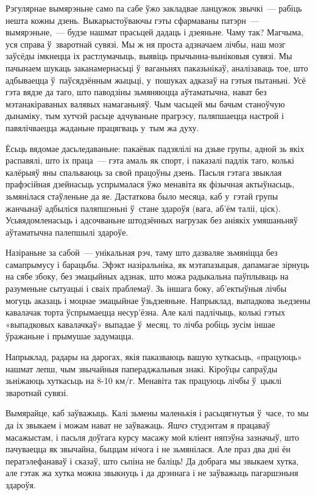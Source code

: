 Рэгулярнае вымярэньне само па сабе ўжо закладвае ланцужок звычкі~--- рабіць нешта кожны дзень. Выкарыстоўваючы гэты сфармаваны патэрн~--- вымярэньне,~--- будзе нашмат прасьцей дадаць і дзеяньне. Чаму так? Магчыма, уся справа ў~зваротнай сувязі. Мы ж ня проста адзначаем лічбы, наш мозг заўсёды імкнецца іх растлумачыць, выявіць прычынна-выніковыя сувязі. Мы пачынаем шукаць заканамернасьці ў~ваганьнях паказьнікаў, аналізаваць тое, што адбываецца ў~паўсядзённым жыцьці, у~пошуках адказаў на гэтыя пытаньні. Усё гэта вядзе да таго, што паводзіны зьмяняюцца аўтаматычна, нават без мэтанакіраваных валявых намаганьняў. Чым часьцей мы бачым станоўчую дынаміку, тым хутчэй расьце адчуваньне прагрэсу, паляпшаецца настрой і павялічваецца жаданьне працягваць у~тым жа духу.

Ёсьць вядомае дасьледаваньне: пакаёвак падзялілі на дзьве групы, адной зь якіх распавялі, што іх праца~--- гэта амаль як спорт, і паказалі падлік таго, колькі калёрыяў яны спальваюць за свой працоўны дзень. Пасьля гэтага звыклая прафэсійная дзейнасьць успрымалася ўжо менавіта як фізычная актыўнасьць, зьмянілася стаўленьне да яе. Дастаткова было месяца, каб у~гэтай групы жанчынаў адбыліся паляпшэньні ў~стане здароўя (вага, аб'ём таліі, ціск). Усьвядомленасьць і адсочваньне штодзённых нагрузак без аніякіх умяшаньняў аўтаматычна палепшылі здароўе.

Назіраньне за сабой~--- унікальная рэч, таму што дазваляе зьмяніцца без самапрымусу і барацьбы. Эфэкт назіральніка, як мэтапазыцыя, дапамагае зірнуць на сябе збоку, без эмацыйных адзнак, што можа радыкальна паўплываць на разуменьне сытуацыі і сваіх праблемаў. Зь іншага боку, аб'ектыўныя лічбы могуць аказаць і моцнае эмацыйнае ўзьдзеяньне. Напрыклад, выпадкова зьедзены кавалачак торта ўспрымаецца несур'ёзна. Але калі падлічыць, колькі гэтых «выпадковых кавалачкаў» выпадае ў~месяц, то лічба робіць зусім іншае ўражаньне і прымушае задумацца.

Напрыклад, радары на дарогах, якія паказваюць вашую хуткасьць, «працуюць» нашмат лепш, чым звычайныя папераджальныя знакі. Кіроўцы сапраўды зьніжаюць хуткасьць на 8-10 км/г. Менавіта так працуюць лічбы ў~цыклі зваротнай сувязі.

Вымярайце, каб заўважыць. Калі зьмены маленькія і расьцягнутыя ў~часе, то мы да іх звыкаем і можам нават не заўважаць. Яшчэ студэнтам я працаваў масажыстам, і пасьля доўгага курсу масажу мой кліент няпэўна зазначыў, што пачуваецца як звычайна, быццам нічога і не зьмянілася. Але праз два дні ён ператэлефанаваў і сказаў, што сьпіна не баліць! Да добрага мы звыкаем хутка, але гэтак жа хутка можна звыкнуць і да дрэннага і не заўважыць пагаршэньня здароўя.

